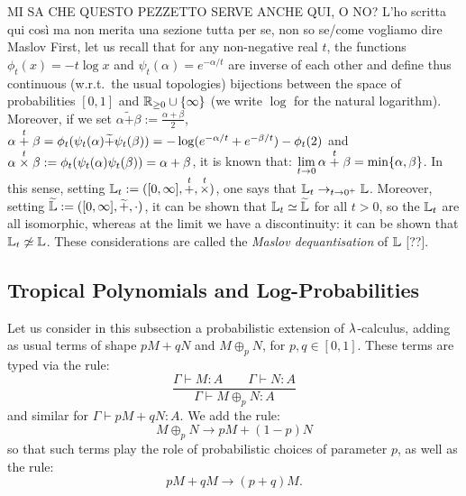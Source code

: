 {\color{red}MI SA CHE QUESTO PEZZETTO SERVE ANCHE QUI, O NO?}
{\color{red}L'ho scritta qui cos\`i ma non merita una sezione tutta per se, non so se/come vogliamo dire Maslov}
First, let us recall that for any non-negative real $t$, the functions $\phi_{t}(x)=-t\log x$ and $\psi_{t}(\alpha)=e^{-\alpha/t}$ are inverse of each other and define thus continuous (w.r.t.\ the usual topologies) bijections between the space of probabilities $[0,1]$ and $\mathbb{R}_{\geq 0}\cup\{\infty\}$ (we write $\log$ for the natural logarithm).
Moreover, if we set $\alpha \widetilde+ \beta:= \frac{\alpha+\beta}{2}$, $\alpha\stackrel{t}{+}\beta=\phi_{t}(\psi_{t}(\alpha)\widetilde{+}\psi_{t}(\beta))=-\log (e^{-\alpha/t}+e^{-\beta/t})-\phi_{t}(2)$ and $\alpha\stackrel{t}{\times} \beta:=\phi_{t}(\psi_{t}(\alpha)\psi_{t}(\beta))=\alpha+\beta$, it is known that: $\lim\limits_{t\to 0}\alpha\stackrel{t}{+} \beta= \min\{\alpha,\beta\}$.
In this sense, setting $\mathbb{L}_t:=([0,\infty],\stackrel{t}{+},\stackrel{t}{\times})$, one says that $\mathbb{L}_t\to_{t\to 0^+}\mathbb{L}$.
Moreover, setting $\widetilde{\mathbb{L}}:=([0,\infty],\widetilde+,\cdot)$, it can be shown that $\mathbb{L}_t\simeq\widetilde{\mathbb{L}}$ for all $t>0$, so the $\mathbb{L}_t$ are all isomorphic, whereas at the limit we have a discontinuity: it can be shown that $\mathbb{L}_t\not\simeq\mathbb{L}$.
These considerations are called the \emph{Maslov dequantisation} of $\mathbb{L}$ [??].

\subsection{Tropical Polynomials and Log-Probabilities}

Let us consider in this subsection a probabilistic extension of $\lambda$-calculus, adding as usual terms of shape $pM+qN$ and $M\oplus_p N$, for $p,q\in[0,1]$.
These terms are typed via the rule:
\[
 \dfrac{\Gamma\vdash M:A \qquad \Gamma\vdash N:A}{\Gamma\vdash M\oplus_p N:A}
\]
and similar for $\Gamma\vdash pM+qN:A$.
We add the rule:
\[
 M\oplus_p N \to pM+(1-p)N
\]
so that such terms play the role of probabilistic choices of parameter $p$, as well as the rule:
\[
 pM+qM\to (p+q)M.
\]

